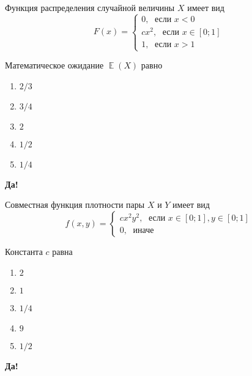 \documentclass[t]{beamer}
\DeclareMathOperator{\E}{\mathbb{E}}
\begin{document}
 \begin{frame} \label{19-Yes} 
\begin{block}{19} 

Функция распределения случайной величины $X$ имеет вид
\[
F(x)=\begin{cases}
0, \; \text{ если } x<0 \\
cx^2, \; \text{ если } x\in [0;1] \\
1, \; \text{ если } x>1
\end{cases}
\]

\vspace{0.5cm} 
 
 
Математическое ожидание $\E(X)$ равно
 


 \end{block} 
\begin{enumerate} 
\item[] \hyperlink{19-Yes}{\beamergotobutton{} $2/3$}
\item[] \hyperlink{19-No}{\beamergotobutton{} $3/4$}
\item[] \hyperlink{19-No}{\beamergotobutton{} $2$
}
\item[] \hyperlink{19-No}{\beamergotobutton{} $1/2$}
\item[] \hyperlink{19-No}{\beamergotobutton{} $1/4$}
\end{enumerate} 

 \textbf{Да!} 
 \hyperlink{20}{}\end{frame} 


 \begin{frame} \label{20-Yes} 
\begin{block}{20} 

Совместная функция плотности пары $X$ и $Y$ имеет вид
\[
f(x,y)=\begin{cases}
cx^2y^2, \; \text{ если } x\in[0;1], y\in [0;1] \\
0, \; \text{ иначе}
\end{cases}
\]

\vspace{0.5cm} 
 
 
Константа $c$ равна
 


 \end{block} 
\begin{enumerate} 
\item[] \hyperlink{20-No}{\beamergotobutton{} $2$
}
\item[] \hyperlink{20-No}{\beamergotobutton{} $1$}
\item[] \hyperlink{20-No}{\beamergotobutton{} $1/4$}
\item[] \hyperlink{20-Yes}{\beamergotobutton{} $9$}
\item[] \hyperlink{20-No}{\beamergotobutton{} $1/2$}
\end{enumerate} 

 \textbf{Да!} 
 \hyperlink{21}{}\end{frame} 
\end{document}
